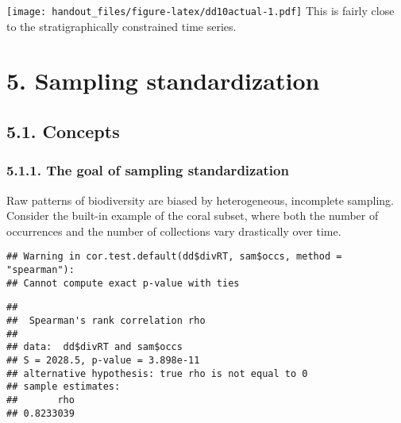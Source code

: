 \documentclass[]{article}
\newenvironment{Shaded}{\begin{snugshade}}{\end{snugshade}}
\newcommand{\DataTypeTok}[1]{\textcolor[rgb]{0.13,0.29,0.53}{#1}}
\newcommand{\KeywordTok}[1]{\textcolor[rgb]{0.13,0.29,0.53}{\textbf{#1}}}
\newcommand{\NormalTok}[1]{#1}
\newcommand{\OperatorTok}[1]{\textcolor[rgb]{0.81,0.36,0.00}{\textbf{#1}}}
\newcommand{\StringTok}[1]{\textcolor[rgb]{0.31,0.60,0.02}{#1}}
\begin{document}
\texttt{[image: handout\_files/figure-latex/dd10actual-1.pdf]} This is
fairly close to the stratigraphically constrained time series.

\hypertarget{sampling-standardization}{%
\section{5. Sampling standardization}\label{sampling-standardization}}

\hypertarget{concepts}{%
\subsection{5.1. Concepts}\label{concepts}}

\hypertarget{the-goal-of-sampling-standardization}{%
\subsubsection{5.1.1. The goal of sampling
standardization}\label{the-goal-of-sampling-standardization}}

Raw patterns of biodiversity are biased by heterogeneous, incomplete
sampling. Consider the built-in example of the coral subset, where both
the number of occurrences and the number of collections vary drastically
over time.

\begin{Shaded}
\end{Shaded}

\begin{verbatim}
## Warning in cor.test.default(dd$divRT, sam$occs, method = "spearman"):
## Cannot compute exact p-value with ties
\end{verbatim}

\begin{verbatim}
## 
##  Spearman's rank correlation rho
## 
## data:  dd$divRT and sam$occs
## S = 2028.5, p-value = 3.898e-11
## alternative hypothesis: true rho is not equal to 0
## sample estimates:
##       rho 
## 0.8233039
\end{verbatim}
\end{document}
